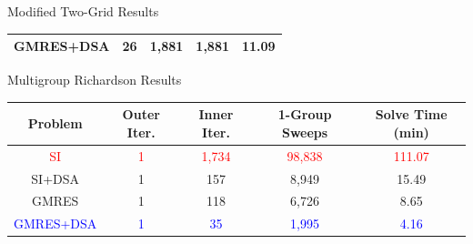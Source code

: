 \documentclass[compress,10pt]{beamer}
\newcommand{\tcr}[1]{\textcolor{red}{#1}}
\newcommand{\tcb}[1]{\textcolor{blue}{#1}}
\begin{document}
\begin{frame}[t]
{{\begin{block}{Modified Two-Grid Results}
\begin{table}
\begin{tabular}{|c|c|c|c|c|}
GMRES+DSA & 26 & 1,881 & 1,881 & 11.09  \\ \hline
\end{tabular}
\end{table}
\end{block}
\vspace{-3mm}
\begin{block}{Multigroup Richardson Results}
\begin{table}
\begin{tabular}{|c|c|c|c|c|}
\hline
Problem & Outer Iter. & Inner Iter. & 1-Group Sweeps & Solve Time (min)  \\
\hline \hline
\tcr{SI} & \tcr{1} & \tcr{1,734} & \tcr{98,838} &  \tcr{111.07} \\ \hline
SI+DSA & 1 & 157 & 8,949 &  15.49 \\ \hline
GMRES & 1 & 118 & 6,726 &  8.65 \\ \hline
\tcb{GMRES+DSA} &  \tcb{1}& \tcb{35} & \tcb{1,995} &  \tcb{4.16} \\ \hline
\end{tabular}
\end{table}
\end{block}
}
}
\end{frame}
\end{document}
